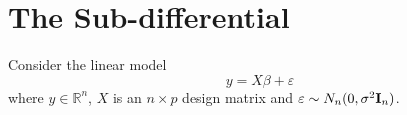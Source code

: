 \documentclass[10pt]{article}
\newcommand{\R}{\mathbb{R}}
\begin{document}
\section{The Sub-differential}\label{sec:sub}






Consider the linear model 
\[
y=X\beta + \varepsilon
\]
where $y\in\R^n$, $X$ is an $n\times p$ design matrix and $\varepsilon \sim N_n(0,\sigma^2{\bf I}_n)$.
\end{document}
